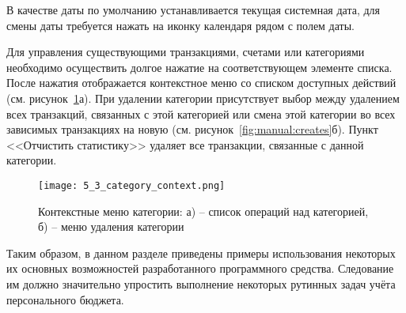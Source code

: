 В качестве даты по умолчанию устанавливается текущая системная дата, для смены даты требуется нажать на иконку календаря рядом с полем даты.

Для управления существующими транзакциями, счетами или категориями необходимо осуществить долгое нажатие на соответствующем элементе списка.
После нажатия отображается контекстное меню со списком доступных действий (см. рисунок~\ref{fig:manual:category_context}а).
При удалении категории присутствует выбор между удалением всех транзакций, связанных с этой категорией или смена этой категории во всех зависимых транзакциях на новую (см. рисунок~\ref{fig:manual:creates}б).
Пункт <<Отчистить статистику>> удаляет все транзакции, связанные с данной категории.

\begin{figure}[H]
    \centering
    \texttt{[image: 5\_3\_category\_context.png]}
    \caption{Контекстные меню категории: а) -- список операций над категорией, б) -- меню удаления категории}
    \label{fig:manual:category_context}
\end{figure}

Таким образом, в данном разделе приведены примеры использования некоторых их основных возможностей разработанного программного средства.
Следование им должно значительно упростить выполнение некоторых рутинных задач учёта персонального бюджета.
